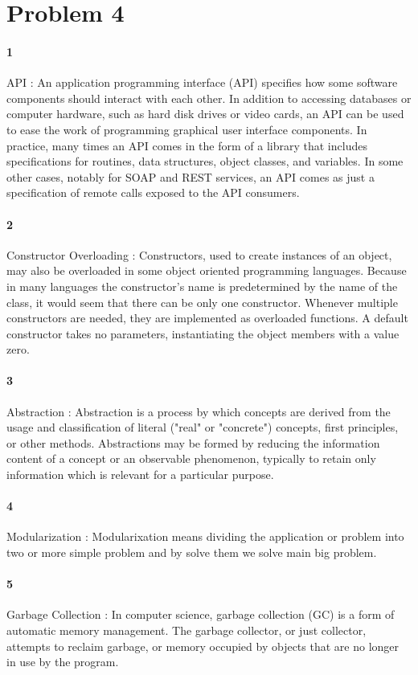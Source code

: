 \documentclass[•]{article}
\begin{document}
\section{Problem 4}
\paragraph{1}
API : An application programming interface (API) specifies how some software components should interact with each other.
In addition to accessing databases or computer hardware, such as hard disk drives or video cards, an API can be used to ease the work of programming graphical user interface components. In practice, many times an API comes in the form of a library that includes specifications for routines, data structures, object classes, and variables. In some other cases, notably for SOAP and REST services, an API comes as just a specification of remote calls exposed to the API consumers.
\paragraph{2}
Constructor Overloading : Constructors, used to create instances of an object, may also be overloaded in some object oriented programming languages. Because in many languages the constructor's name is predetermined by the name of the class, it would seem that there can be only one constructor. Whenever multiple constructors are needed, they are implemented as overloaded functions. A default constructor takes no parameters, instantiating the object members with a value zero.
\paragraph{3}
Abstraction : Abstraction is a process by which concepts are derived from the usage and classification of literal ("real" or "concrete") concepts, first principles, or other methods.
Abstractions may be formed by reducing the information content of a concept or an observable phenomenon, typically to retain only information which is relevant for a particular purpose.
\paragraph{4}
Modularization : Modularixation means dividing the application or problem into two or more simple problem and by solve them we solve main big problem.
\paragraph{5}
Garbage Collection : In computer science, garbage collection (GC) is a form of automatic memory management. The garbage collector, or just collector, attempts to reclaim garbage, or memory occupied by objects that are no longer in use by the program.
\end{document}
